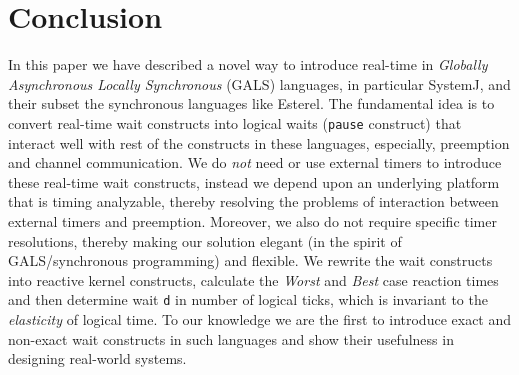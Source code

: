 \section{Conclusion}
\label{sec:concl-future-work}

In this paper we have described a novel way to introduce real-time in
\textit{Globally Asynchronous Locally Synchronous} (GALS) languages, in
particular SystemJ, and their subset the synchronous languages like
Esterel. The fundamental idea is to convert real-time wait constructs
into logical waits (\texttt{pause} construct) that interact well with
rest of the constructs in these languages, especially, preemption and
channel communication. We do \textit{not} need or use external timers to
introduce these real-time wait constructs, instead we depend upon an
underlying platform that is timing analyzable, thereby resolving the
problems of interaction between external timers and
preemption. Moreover, we also do not require specific timer resolutions,
thereby making our solution elegant (in the spirit of GALS/synchronous
programming) and flexible. We rewrite the wait constructs into reactive
kernel constructs, calculate the \textit{Worst} and \textit{Best} case
reaction times and then determine wait \texttt{d} in number of logical
ticks, which is invariant to the \textit{elasticity} of logical time. To
our knowledge we are the first to introduce exact and non-exact wait
constructs in such languages and show their usefulness in designing
real-world systems.



